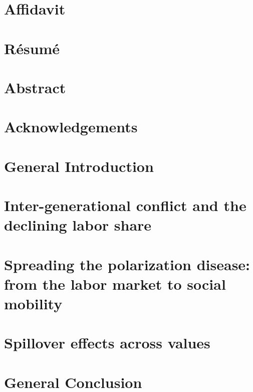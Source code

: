 \documentclass{amse_these}
\begin{document}
	\chead{}
	\thispagestyle{empty}
	
	\newpage
 	\chapter*{Affidavit}
	\thispagestyle{empty}
	

	\chapter*{Résumé}					%
	

	\chapter*{Abstract}					%
	

	\chapter*{Acknowledgements}			%
	
	
    	\tableofcontents				%
    	\listoffigures					%
    	\listoftables					%

	\chapter*{General Introduction}
	
    \clearpage
	\ohead{\leftmark\ifstr{\rightmark}{\leftmark}{}{ -- \rightmark}} %

	\chapter{Inter-generational conflict and the declining labor share}\label{chap1}
	

	\chapter{Spreading the polarization disease: from the labor market to social mobility}\label{chap2}
	

	\chapter{Spillover effects across values}\label{chap3}
	

	\chapter*{General Conclusion}
	
\end{document}
